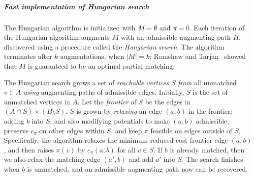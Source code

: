 \documentclass[a4paper,UKenglish]{socg-lipics-v2018}
\makeatletter
\def\abs#1{\mathopen| #1 \mathclose|}		%
\theoremstyle{plain}
\numberwithin{figure}{section}
\renewcommand{\paragraph}{\subparagraph}
\def\EMPH#1{\textcolor{BrickRed}{{\emph{#1}}}}
\def\n@te#1{\textsf{\boldmath \textbf{$\langle\!\langle$#1$\rangle\!\rangle$}}\leavevmode}
\def\note#1{\textcolor{red}{\n@te{#1}}}
\makeatother
\begin{document}
\paragraph{Fast implementation of Hungarian search}
The Hungarian algorithm is initialized with $M = \emptyset$ and $\pi = 0$.
Each iteration of the Hungarian algorithm augments $M$ with an admissible
augmenting path $\Pi$, discovered using a procedure called the
\EMPH{Hungarian search}.
The algorithm terminates after $k$ augmentations, when $\abs{M} = k$;
Ramshaw and Tarjan~\cite{RT12} showed that $M$ is guaranteed to be an optimal partial matching.

The Hungarian search grows a set of \EMPH{reachable vertices $S$} \emph{from}
all unmatched $v \in A$ \emph{using} augmenting paths of admissible edges.
Initially, $S$ is the set of unmatched vertices in $A$.
Let the \EMPH{frontier} of $S$ be the edges in $(A \cap S) \times (B \setminus S)$.
$S$ is grown by \EMPH{relaxing} an edge $(a, b)$ in the frontier:
adding $b$ into $S$, and also modifying potentials to make $(a, b)$ admissible,
preserve $c_\pi$ on other edges within $S$, and keep $\pi$ feasible on edges outside of $S$.
Specifically, the algorithm relaxes the minimum-reduced-cost frontier edge $(a, b)$,
and then raises $\pi(v)$ by $c_\pi(a, b)$ for all $v \in S$.
%
If $b$ is already matched, then we also relax the matching edge $(a',b)$ and add $a'$ into $S$.
The search finishes when $b$ is unmatched, and an admissible augmenting path now can be recovered.
\end{document}
